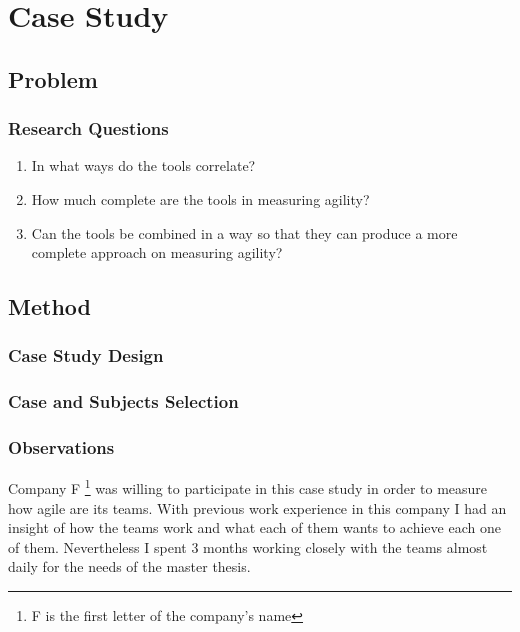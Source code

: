 \chapter{Case Study}\label{ch:case study}

\newcommand{\mysubparagraph}[1]{\subparagraph{#1}\mbox{}\\}

\section{Problem}


\subsection{Research Questions}
\begin{enumerate}
\item In what ways do the tools correlate?
\item How much complete are the tools in measuring agility?
\item Can the tools be combined in a way so that they can produce a more complete approach on measuring agility?
\end{enumerate}

\section{Method}

\subsection{Case Study Design}

\subsection{Case and Subjects Selection}

\subsection{Observations}
Company F \footnote{F is the first letter of the company's name} was willing to participate in this case study in order to measure how agile are its teams. With previous work experience in this company I had an insight of how the teams work and what each of them wants to achieve each one of them. Nevertheless I spent 3 months working closely with the teams almost daily for the needs of the master thesis.

